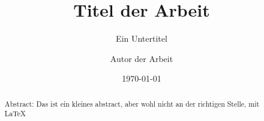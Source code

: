 \title{Titel der Arbeit}
\subtitle{Ein Untertitel}
\author{Autor der Arbeit}
\date{\today}
\maketitle
\begin{abstract}
    Abstract: Das ist ein kleines abstract, aber wohl nicht an der richtigen Stelle, mit \LaTeX
\end{abstract}
\thispagestyle{empty}
\clearpage
\tableofcontents